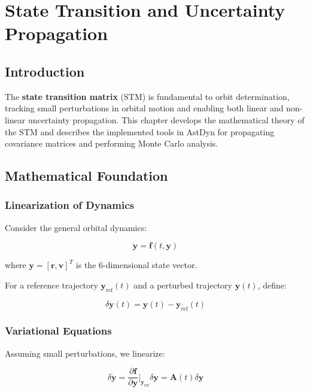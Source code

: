 \chapter{State Transition and Uncertainty Propagation}
\label{ch:state_transition}

\section{Introduction}

The \textbf{state transition matrix} (STM) is fundamental to orbit determination, tracking small perturbations in orbital motion and enabling both linear and non-linear uncertainty propagation. This chapter develops the mathematical theory of the STM and describes the implemented tools in AstDyn for propagating covariance matrices and performing Monte Carlo analysis.

\section{Mathematical Foundation}

\subsection{Linearization of Dynamics}

Consider the general orbital dynamics:

\begin{equation}
    \dot{\mathbf{y}} = \mathbf{f}(t, \mathbf{y})
\end{equation}

where $\mathbf{y} = [\mathbf{r}, \mathbf{v}]^T$ is the 6-dimensional state vector.

For a reference trajectory $\mathbf{y}_{\text{ref}}(t)$ and a perturbed trajectory $\mathbf{y}(t)$, define:

\begin{equation}
    \delta\mathbf{y}(t) = \mathbf{y}(t) - \mathbf{y}_{\text{ref}}(t)
\end{equation}

\subsection{Variational Equations}

Assuming small perturbations, we linearize:

\begin{equation}
    \delta\dot{\mathbf{y}} = \frac{\partial\mathbf{f}}{\partial\mathbf{y}}\bigg|_{\mathbf{y}_{\text{ref}}} \delta\mathbf{y} = \mathbf{A}(t) \delta\mathbf{y}
\end{equation}

